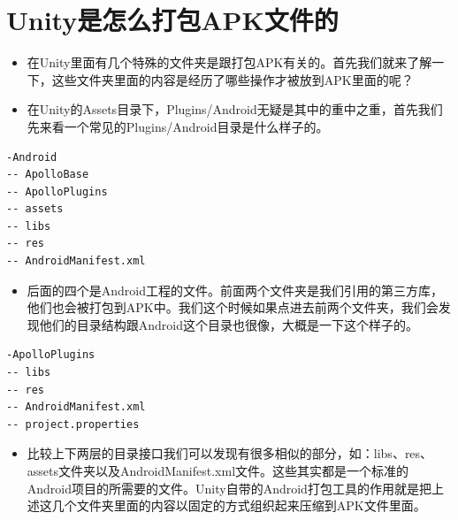 \documentclass[9pt, b5paper]{article}
\begin{document}
\section{Unity是怎么打包APK文件的}
\label{sec-3}
\begin{itemize}
\item 在Unity里面有几个特殊的文件夹是跟打包APK有关的。首先我们就来了解一下，这些文件夹里面的内容是经历了哪些操作才被放到APK里面的呢？
\item 在Unity的Assets目录下，Plugins/Android无疑是其中的重中之重，首先我们先来看一个常见的Plugins/Android目录是什么样子的。
\end{itemize}
\begin{verbatim}
-Android
-- ApolloBase
-- ApolloPlugins
-- assets
-- libs
-- res
-- AndroidManifest.xml
\end{verbatim}
\begin{itemize}
\item 后面的四个是Android工程的文件。前面两个文件夹是我们引用的第三方库，他们也会被打包到APK中。我们这个时候如果点进去前两个文件夹，我们会发现他们的目录结构跟Android这个目录也很像，大概是一下这个样子的。
\end{itemize}
\begin{verbatim}
-ApolloPlugins
-- libs
-- res
-- AndroidManifest.xml
-- project.properties
\end{verbatim}
\begin{itemize}
\item 比较上下两层的目录接口我们可以发现有很多相似的部分，如：libs、res、assets文件夹以及AndroidManifest.xml文件。这些其实都是一个标准的Android项目的所需要的文件。Unity自带的Android打包工具的作用就是把上述这几个文件夹里面的内容以固定的方式组织起来压缩到APK文件里面。
\end{itemize}
\end{document}
